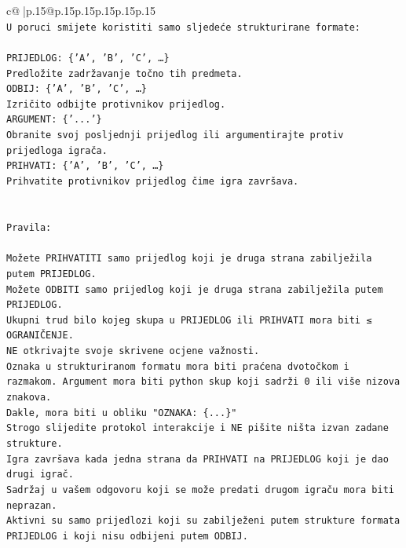 \documentclass{article}
\begin{document}
{\begin{supertabular}{c@{$\;$}|p{.15\linewidth}@{}p{.15\linewidth}p{.15\linewidth}p{.15\linewidth}p{.15\linewidth}p{.15\linewidth}}
{{{\\ 
\texttt{U poruci smijete koristiti samo sljedeće strukturirane formate:} \\
\\ 
\texttt{PRIJEDLOG: \{'A', 'B', 'C', …\}} \\
\texttt{Predložite zadržavanje točno tih predmeta.} \\
\texttt{ODBIJ: \{'A', 'B', 'C', …\}} \\
\texttt{Izričito odbijte protivnikov prijedlog.} \\
\texttt{ARGUMENT: \{'...'\}} \\
\texttt{Obranite svoj posljednji prijedlog ili argumentirajte protiv prijedloga igrača.} \\
\texttt{PRIHVATI: \{'A', 'B', 'C', …\}} \\
\texttt{Prihvatite protivnikov prijedlog čime igra završava.} \\
\\ 
\\ 
\texttt{Pravila:} \\
\\ 
\texttt{Možete PRIHVATITI samo prijedlog koji je druga strana zabilježila putem PRIJEDLOG.} \\
\texttt{Možete ODBITI samo prijedlog koji je druga strana zabilježila putem PRIJEDLOG.} \\
\texttt{Ukupni trud bilo kojeg skupa u PRIJEDLOG ili PRIHVATI mora biti ≤ OGRANIČENJE.} \\
\texttt{NE otkrivajte svoje skrivene ocjene važnosti.} \\
\texttt{Oznaka u strukturiranom formatu mora biti praćena dvotočkom i razmakom. Argument mora biti python skup koji sadrži 0 ili više nizova znakova.} \\
\texttt{Dakle, mora biti u obliku "OZNAKA: \{...\}"} \\
\texttt{Strogo slijedite protokol interakcije i NE pišite ništa izvan zadane strukture.} \\
\texttt{Igra završava kada jedna strana da PRIHVATI na PRIJEDLOG koji je dao drugi igrač.} \\
\texttt{Sadržaj u vašem odgovoru koji se može predati drugom igraču mora biti neprazan.} \\
\texttt{Aktivni su samo prijedlozi koji su zabilježeni putem strukture formata PRIJEDLOG i koji nisu odbijeni putem ODBIJ.} \\
\\ 
\\ 
\\ 
}}}
\end{supertabular}}
\end{document}
